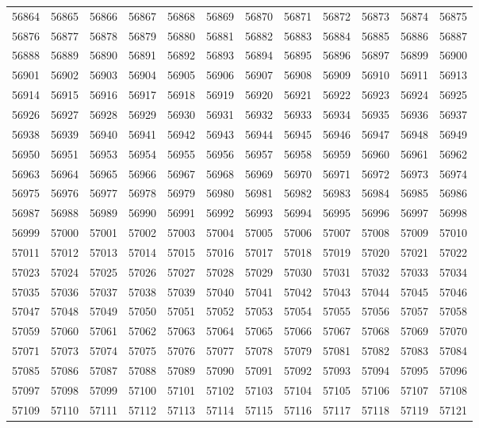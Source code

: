\begin{center}
\begin{longtable}{llllllllllll}
56864 &56865 &56866 &56867 &56868 &56869 &56870 &56871 &56872 &56873 &56874 &56875 \\
56876 &56877 &56878 &56879 &56880 &56881 &56882 &56883 &56884 &56885 &56886 &56887 \\
56888 &56889 &56890 &56891 &56892 &56893 &56894 &56895 &56896 &56897 &56899 &56900 \\
56901 &56902 &56903 &56904 &56905 &56906 &56907 &56908 &56909 &56910 &56911 &56913 \\
56914 &56915 &56916 &56917 &56918 &56919 &56920 &56921 &56922 &56923 &56924 &56925 \\
56926 &56927 &56928 &56929 &56930 &56931 &56932 &56933 &56934 &56935 &56936 &56937 \\
56938 &56939 &56940 &56941 &56942 &56943 &56944 &56945 &56946 &56947 &56948 &56949 \\
56950 &56951 &56953 &56954 &56955 &56956 &56957 &56958 &56959 &56960 &56961 &56962 \\
56963 &56964 &56965 &56966 &56967 &56968 &56969 &56970 &56971 &56972 &56973 &56974 \\
56975 &56976 &56977 &56978 &56979 &56980 &56981 &56982 &56983 &56984 &56985 &56986 \\
56987 &56988 &56989 &56990 &56991 &56992 &56993 &56994 &56995 &56996 &56997 &56998 \\
56999 &57000 &57001 &57002 &57003 &57004 &57005 &57006 &57007 &57008 &57009 &57010 \\
57011 &57012 &57013 &57014 &57015 &57016 &57017 &57018 &57019 &57020 &57021 &57022 \\
57023 &57024 &57025 &57026 &57027 &57028 &57029 &57030 &57031 &57032 &57033 &57034 \\
57035 &57036 &57037 &57038 &57039 &57040 &57041 &57042 &57043 &57044 &57045 &57046 \\
57047 &57048 &57049 &57050 &57051 &57052 &57053 &57054 &57055 &57056 &57057 &57058 \\
57059 &57060 &57061 &57062 &57063 &57064 &57065 &57066 &57067 &57068 &57069 &57070 \\
57071 &57073 &57074 &57075 &57076 &57077 &57078 &57079 &57081 &57082 &57083 &57084 \\
57085 &57086 &57087 &57088 &57089 &57090 &57091 &57092 &57093 &57094 &57095 &57096 \\
57097 &57098 &57099 &57100 &57101 &57102 &57103 &57104 &57105 &57106 &57107 &57108 \\
57109 &57110 &57111 &57112 &57113 &57114 &57115 &57116 &57117 &57118 &57119 &57121 \\

\end{longtable}
\end{center}
